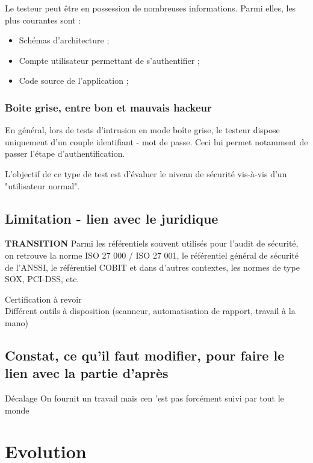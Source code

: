 \documentclass[a4paper]{memoir}
\begin{document}
Le testeur peut être en possession de nombreuses informations. Parmi elles, les plus courantes sont :

\begin{itemize}
   \item Schémas d'architecture ;
   \item Compte utilisateur permettant de s'authentifier ;
   \item Code source de l'application ;
\end{itemize}


\section{Boite grise, entre bon et mauvais hackeur}

En général, lors de tests d'intrusion en mode boîte grise, le testeur dispose uniquement d'un couple identifiant - mot de passe. Ceci lui permet notamment de passer l'étape d'authentification.

L'objectif de ce type de test est d'évaluer le niveau de sécurité vis-à-vis d'un "utilisateur normal".


\chapter{Limitation - lien avec le juridique}

\textbf{TRANSITION}
Parmi les référentiels souvent utilisés pour l’audit de sécurité, on retrouve la norme ISO 27 000 / ISO 27 001, le référentiel général de sécurité de l’ANSSI, le référentiel COBIT et dans d’autres contextes, les normes de type SOX, PCI-DSS, etc.

Certification à revoir\\

  
Différent outils à disposition
(scanneur, automatisation de rapport, travail à la mano)

\chapter{Constat, ce qu'il faut modifier, pour faire le lien avec la partie d'après}

Décalage
On fournit un travail mais cen 'est pas forcément suivi par tout le monde 

\part{Evolution}
\end{document}
